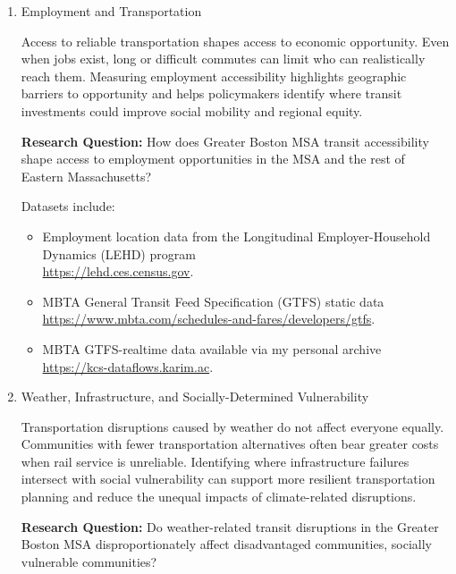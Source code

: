 \documentclass[12pt]{article}
\begin{document}
\begin{enumerate}
    \item Employment and Transportation
    
        Access to reliable transportation shapes access to economic opportunity. 
        Even when jobs exist, long or difficult commutes can limit who can realistically reach them. 
        Measuring employment accessibility highlights geographic barriers to opportunity and helps policymakers identify where transit investments could improve social mobility and regional equity.
    
    \textbf{Research Question:} How does Greater Boston MSA transit accessibility shape access to employment opportunities in the MSA and the rest of Eastern Massachusetts? 

    Datasets include:
    \begin{itemize}
        \item Employment location data from the Longitudinal Employer-Household Dynamics (LEHD) program \\ \url{https://lehd.ces.census.gov}.
        \item MBTA General Transit Feed Specification (GTFS) static data \\ \url{https://www.mbta.com/schedules-and-fares/developers/gtfs}.
        \item MBTA GTFS-realtime data available via my personal archive \\ \url{https://kcs-dataflows.karim.ac}.
    \end{itemize}

    \item Weather, Infrastructure, and Socially-Determined Vulnerability
    
    Transportation disruptions caused by weather do not affect everyone equally. 
    Communities with fewer transportation alternatives often bear greater costs when rail service is unreliable. 
    Identifying where infrastructure failures intersect with social vulnerability can support more resilient transportation planning and reduce the unequal impacts of climate-related disruptions.

    \textbf{Research Question:} Do weather-related transit disruptions in the Greater Boston MSA disproportionately affect disadvantaged communities, socially vulnerable communities?


\end{enumerate}
\end{document}
